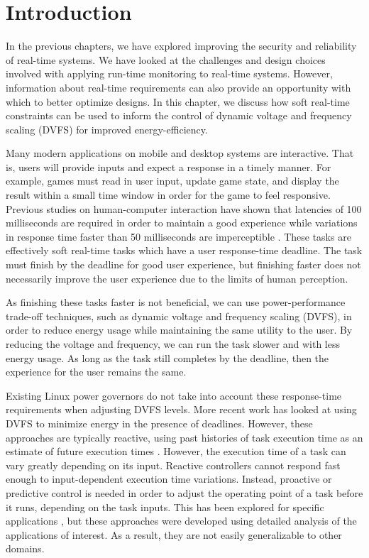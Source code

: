 \section{Introduction}
\label{sec:exec_time_prediction.introduction}

In the previous chapters, we have explored improving the security and
reliability of real-time systems. We have looked at the challenges and design
choices involved with applying run-time monitoring to real-time systems.
However, information about real-time requirements can also provide an
opportunity with which to better optimize designs. In this chapter, we discuss
how soft real-time constraints can be used to inform the control of
dynamic voltage and frequency scaling (DVFS) for improved energy-efficiency.

Many modern applications on mobile and desktop systems are interactive.
That is, users will provide inputs and expect a response in a timely manner.
For example, games must read in user input, update game state, and display the
result within a small time window in order for the game to feel responsive.
Previous studies on human-computer interaction have shown that latencies of 100
milliseconds are required in order to maintain a good experience
\cite{endo-osdi96, card-chi91, miller-afips68} while variations in response
time faster than 50 milliseconds are imperceptible \cite{lindgaard-bit06,
eqos-hpca15}. These tasks are effectively soft real-time tasks which have a
user response-time deadline. The task must finish by the deadline for good user
experience, but finishing faster does not necessarily improve the user
experience due to the limits of human perception.

As finishing these tasks faster is not beneficial, we can use power-performance
trade-off techniques, such as dynamic voltage and frequency scaling (DVFS), in
order to reduce energy usage while maintaining the same utility to the user. By
reducing the voltage and frequency, we can run the task slower and with less
energy usage. As long as the task still completes by the deadline, then the
experience for the user remains the same. 

Existing Linux power governors \cite{linux_governors} do not take into account
these response-time requirements when adjusting DVFS levels. More recent work
has looked at using DVFS to minimize energy in the presence of deadlines.
However, these approaches are typically reactive, using past histories of task
execution time as an estimate of future execution times \cite{gu-dac08,
choi-iccad02, pegasus-isca14, nachiappan-hpca15}.  However, the execution time
of a task can vary greatly depending on its input.  Reactive controllers cannot
respond fast enough to input-dependent execution time variations.  Instead,
proactive or predictive control is needed in order to adjust the operating
point of a task before it runs, depending on the task inputs. This has been
explored for specific applications \cite{gu-rtas08, zhu-hpca13, eqos-hpca15,
adrenaline-hpca15}, but these approaches were developed using detailed analysis
of the applications of interest. As a result, they are not easily generalizable
to other domains.

